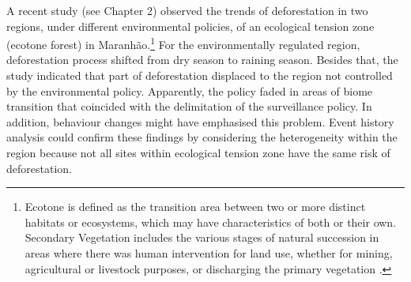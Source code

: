 A recent study (see Chapter 2) observed the trends of deforestation in two regions, under different environmental policies, of an ecological tension zone (ecotone forest) in Maranhão.\footnote{Ecotone is defined as the transition area between two or more distinct habitats or ecosystems, which may have characteristics of both or their own. Secondary Vegetation includes the various stages of natural succession in areas where there was human intervention for land use, whether for mining, agricultural or livestock purposes, or discharging the primary vegetation \citep{SANTOS-FILHO_2013}.} For the environmentally regulated region, deforestation process shifted from dry season to raining season. Besides that, the study indicated that part of deforestation displaced to the region not controlled by the environmental policy. Apparently, the policy faded in areas of biome transition that coincided with the delimitation of the surveillance policy. In addition, behaviour changes might have emphasised this problem. Event history analysis could confirm these findings by considering the heterogeneity within the region because not all sites within ecological tension zone have the same risk of deforestation. 


